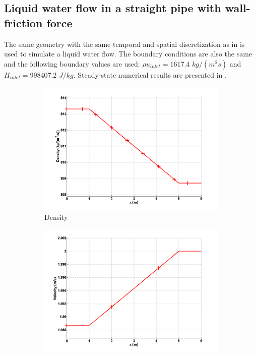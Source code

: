 \subsection{Liquid water flow in a straight pipe with wall-friction force} \label{sec:1d-wall-fricition-liquid}
The same geometry with the same temporal and spatial discretization as in  is used to simulate a liquid water flow. The boundary conditions are also the same and the following boundary values are used: $\rho u_{inlet} = 1617.4$ $kg/(m^2 s)$ and $H_{inlet}=998407.2$ $J / kg$. Steady-state numerical results are presented in .
%
\begin{figure}[H]
        \centering
        \begin{subfigure}[b]{0.495\textwidth}
                \centering
                \includegraphics[width=\textwidth]{figures/liquid_friction_density_source_terms.png}
                \caption{Density}
                \label{fig:1d-liquid-friction-density-sct3}
        \end{subfigure}%
        \begin{subfigure}[b]{0.495\textwidth}
                \centering
                \includegraphics[width=\textwidth]{figures/liquid_friction_velocity_source_terms.png}

\end{subfigure}
\end{figure}
